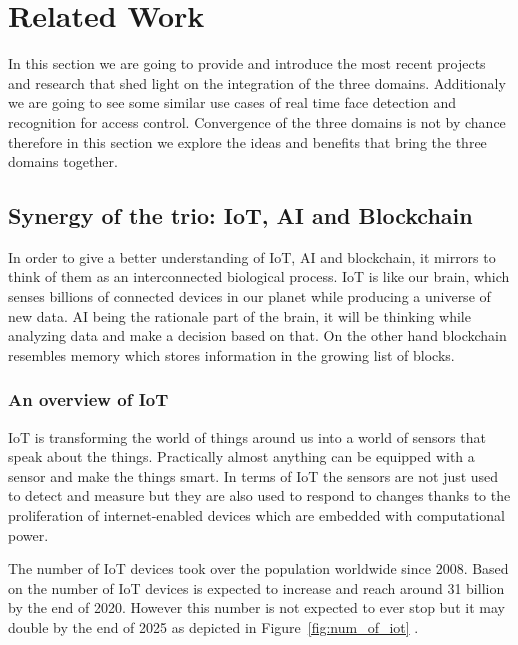 \chapter{Related Work}
\label{chap:related_work}

In this section we are going to provide and introduce the most recent projects and research that shed light on the integration of the three domains. Additionaly we are going to see some similar use cases of real time face detection and recognition for access control. Convergence of the three domains is not by chance therefore in this section we explore the ideas and benefits that bring the three domains together. 

\section{Synergy of the trio: IoT, AI and Blockchain }

In order to give a better understanding of IoT, AI and blockchain, it mirrors to think of them as an interconnected biological process. IoT is like our brain, which senses billions of connected devices in our planet while producing a universe of new data. AI being the rationale part of the brain, it will be thinking while analyzing data and make a decision based on that. On the other hand blockchain resembles memory which stores information in the growing list of blocks.
\subsection{An overview of IoT}

IoT is transforming the world of things around us into a world of sensors that speak about the things. Practically almost anything can be equipped with a sensor and make the things smart. In terms of IoT the sensors are not just used to detect and measure but they are also used to respond to changes thanks to the proliferation of internet-enabled devices which are embedded with computational power. 

The number of IoT devices took over the population worldwide since 2008. Based on \cite{ITU} the number of IoT devices is expected to increase and reach around 31 billion by the end of 2020. However this number is not expected to ever stop but it may double by the end of 2025 \cite{soton421529} as depicted in Figure~\ref{fig:num_of_iot} .

